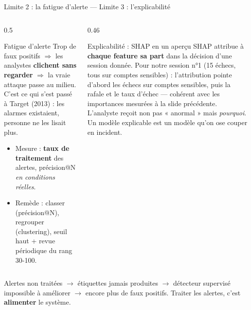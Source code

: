 \begin{frame}{Limite 2 : la fatigue d'alerte --- Limite 3 : l'explicabilité}
\footnotesize%
\begin{columns}[t]
\begin{column}{0.5\textwidth}
\begin{block}{Fatigue d'alerte}
Trop de faux positifs $\Rightarrow$ les analystes \textbf{clichent sans
regarder} $\Rightarrow$ la vraie attaque passe au milieu. C'est ce qui s'est
passé à Target (2013) : les alarmes existaient, personne ne les lisait plus.
\begin{itemize}
\item Mesure : \textbf{taux de traitement} des alertes, précision@N
\emph{en conditions réelles}.
\item Remède : classer (précision@N), regrouper (clustering), seuil haut +
revue périodique du rang 30-100.
\end{itemize}
\end{block}
\end{column}
\begin{column}{0.46\textwidth}
\begin{block}{Explicabilité : SHAP en un aperçu}
SHAP attribue à \textbf{chaque feature sa part} dans la décision d'une
session donnée. Pour notre session n°1 (15 échecs, tous sur comptes
sensibles) : l'attribution pointe d'abord les échecs sur comptes sensibles,
puis la rafale et le taux d'échec --- cohérent avec les importances
mesurées à la slide précédente.
L'analyste reçoit non pas « anormal » mais \emph{pourquoi}. Un modèle
explicable est un modèle qu'on ose couper en incident.
\end{block}
\end{column}
\end{columns}
\vspace{1mm}
\begin{wbox}
Alertes non traitées $\rightarrow$ étiquettes jamais produites $\rightarrow$
détecteur supervisé impossible à améliorer $\rightarrow$ encore plus de faux
positifs. Traiter les alertes, c'est \textbf{alimenter} le système.
\end{wbox}
\end{frame}

